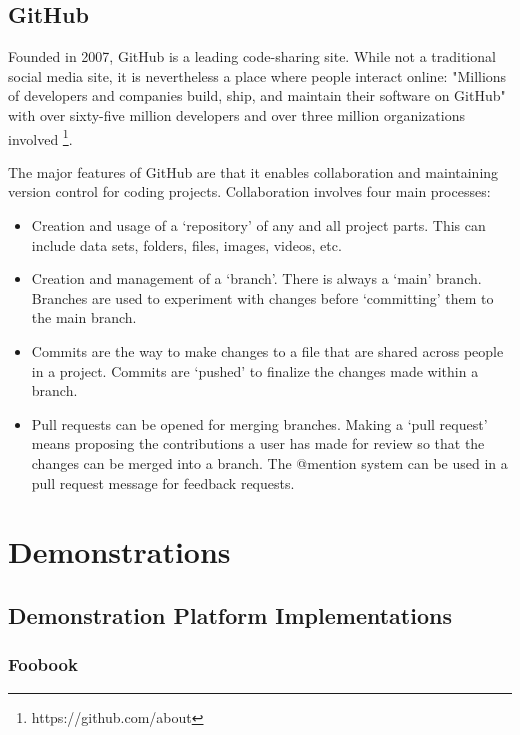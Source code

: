 {{{\subsection{GitHub}
Founded in 2007, GitHub is a leading code-sharing site. While not a traditional social media site, it is nevertheless a place where people interact online: "Millions of developers and companies build, ship, and maintain their software on GitHub" with over sixty-five million developers and over three million organizations involved \footnote{https://github.com/about}. 
\par The major features of GitHub are that it enables collaboration and maintaining version control for coding projects. Collaboration involves  four main processes:
\begin{itemize}
\item Creation and usage of a `repository' of any and all project parts. This can include data sets, folders, files, images, videos, etc. 
\item Creation and management of a `branch'. There is always a `main' branch. Branches are used to experiment with changes before `committing' them to the main branch. 
\item Commits are the way to make changes to a file that are shared across people in a project. Commits are `pushed' to finalize the changes made within a branch.
\item Pull requests can be opened for merging branches. Making a `pull request' means proposing the contributions a user has made for review so that the changes can be merged into a branch. The @mention system can be used in a pull request message for feedback requests.
\end{itemize}





\section{Demonstrations}

\subsection{Demonstration Platform Implementations}

\subsubsection{Foobook}

}}}
